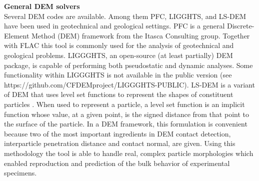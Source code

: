 \noindent\textbf{General DEM solvers}\\
Several DEM codes are available. Among them PFC, LIGGHTS, and LS-DEM have been used in geotechnical and geological settings.
PFC is a general Discrete-Element Method (DEM) framework from the Itasca Consulting group. Together with FLAC this tool is commonly used for the analysis of geotechnical and geological problems.
LIGGGHTS, an open-source (at least partially) DEM package, is capable of performing both pseudostatic and dynamic analyses. Some functionality within LIGGGHTS is not available in the public version (see https://github.com/CFDEMproject/LIGGGHTS-PUBLIC). LS-DEM is a variant of DEM that uses level set functions to represent the shapes of constituent particles \citep{kawamoto2018}. When used to represent a particle, a level set function is an implicit function whose value, at a given point, is the signed distance from that point to the surface of the particle. In a DEM framework, this formulation is convenient because two of the most important ingredients in DEM contact detection, interparticle penetration distance and contact normal, are given. Using this methodology the tool is able to handle real, complex particle morphologies which enabled reproduction and prediction of the bulk behavior of experimental specimens.